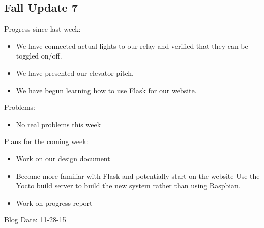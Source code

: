 \subsection{Fall Update 7}
Progress since last week:
\begin{itemize}
\item We have connected actual lights to our relay and verified that they can be toggled on/off.
\item We have presented our elevator pitch.
\item We have begun learning how to use Flask for our website.
\end{itemize}
Problems:
\begin{itemize}
\item No real problems this week
\end{itemize}
Plans for the coming week: 
\begin{itemize}
\item Work on our design document​
\item Become more familiar with Flask and potentially start on the website
Use the Yocto build server to build the new system rather than using Raspbian.
\item Work on progress report
\end{itemize}
Blog Date: 11-28-15


